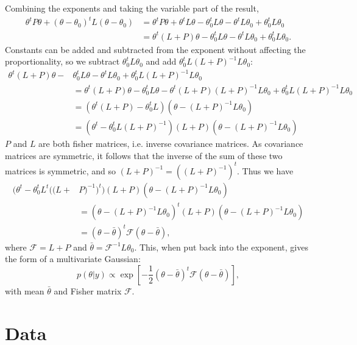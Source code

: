 \documentclass[a4paper,11pt,twoside]{article}
\begin{document}
Combining the exponents and taking the variable part of the result,
\begin{align*}
	\theta^t P \theta + (\theta - \theta_0)^t L (\theta - \theta_0) &= \theta^t P \theta + \theta^t L \theta - \theta_0^t L \theta - \theta^t L \theta_0 + \theta_0^t L \theta_0
	\\ &= \theta^t(L+P) \theta - \theta_0^t L \theta - \theta^t L \theta_0 + \theta_0^t L \theta_0.
\end{align*}
Constants can be added and subtracted from the exponent without affecting the proportionality, so we subtract $\theta_0^t L \theta_0$ and add $\theta_0^t L (L+P)^{-1} L \theta_0$:
\begin{align*}
	\theta^t(L+P) \theta - & \theta_0^t L \theta - \theta^t L \theta_0 + \theta_0^t L (L+P)^{-1} L \theta_0
	\\ &= \theta^t(L+P) \theta - \theta_0^t L \theta - \theta^t(L+P)(L+P)^{-1} L \theta_0 + \theta_0^t L (L+P)^{-1} L \theta_0
	\\ &= (\theta^t(L+P) - \theta_0^t L)(\theta - (L+P)^{-1} L \theta_0)
	\\ &= (\theta^t - \theta_0^t L (L+P)^{-1})(L+P)(\theta - (L+P)^{-1} L \theta_0)
\end{align*}
$P$ and $L$ are both fisher matrices, i.e. inverse covariance matrices. As
covariance matrices are symmetric, it follows that the inverse of the sum of
these two matrices is symmetric, and so $(L+P)^{-1} = ((L+P)^{-1})^{t}$. Thus we have
\begin{align*}
	(\theta^t - \theta_0^t L^t ((L+ & P)^{-1})^{t}) (L+P) (\theta - (L+P)^{-1} L \theta_0)
	\\ &= (\theta -(L+P)^{-1} L \theta_0)^{t} (L+P) (\theta - (L+P)^{-1} L \theta_0)
	\\ &= (\theta - \bar{\theta})^t \mathcal{F} (\theta - \bar{\theta}),
\end{align*}
where $\mathcal{F} = L + P$ and $\bar{\theta} = \mathcal{F}^{-1} L \theta_0$.
This, when put back into the exponent, gives the form of a multivariate
Gaussian:
\begin{equation*}
	p(\theta|y) \propto \exp \left[-\frac{1}{2}(\theta - \bar{\theta})^t \mathcal{F} (\theta - \bar{\theta})\right],
\end{equation*}
with mean $\bar{\theta}$ and Fisher matrix $\mathcal{F}$.

\section{Data}
\label{sec:data}
\end{document}
